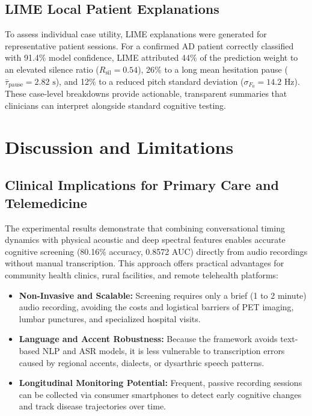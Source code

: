 \documentclass[conference]{IEEEtran}
\begin{document}
\subsection{LIME Local Patient Explanations}
To assess individual case utility, LIME explanations were generated for representative patient sessions. For a confirmed AD patient correctly classified with 91.4\% model confidence, LIME attributed 44\% of the prediction weight to an elevated silence ratio ($R_{\text{sil}} = 0.54$), 26\% to a long mean hesitation pause ($\bar{\tau}_{\text{pause}} = 2.82\text{ s}$), and 12\% to a reduced pitch standard deviation ($\sigma_{F_0} = 14.2\text{ Hz}$). These case-level breakdowns provide actionable, transparent summaries that clinicians can interpret alongside standard cognitive testing.

\section{Discussion and Limitations}

\subsection{Clinical Implications for Primary Care and Telemedicine}
The experimental results demonstrate that combining conversational timing dynamics with physical acoustic and deep spectral features enables accurate cognitive screening (80.16\% accuracy, 0.8572 AUC) directly from audio recordings without manual transcription. This approach offers practical advantages for community health clinics, rural facilities, and remote telehealth platforms:
\begin{itemize}
    \item \textbf{Non-Invasive and Scalable:} Screening requires only a brief (1 to 2 minute) audio recording, avoiding the costs and logistical barriers of PET imaging, lumbar punctures, and specialized hospital visits.
    \item \textbf{Language and Accent Robustness:} Because the framework avoids text-based NLP and ASR models, it is less vulnerable to transcription errors caused by regional accents, dialects, or dysarthric speech patterns.
    \item \textbf{Longitudinal Monitoring Potential:} Frequent, passive recording sessions can be collected via consumer smartphones to detect early cognitive changes and track disease trajectories over time.
\end{itemize}
\end{document}
